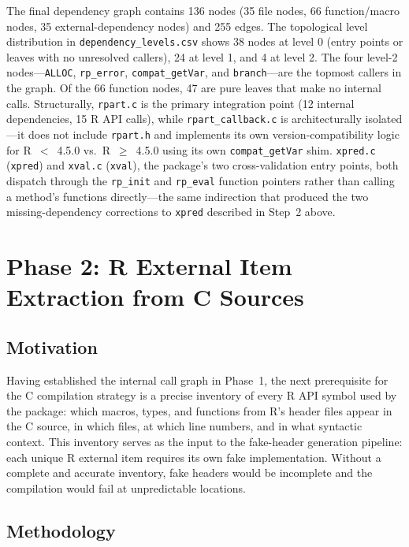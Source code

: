\documentclass[12pt]{article}
\begin{document}
The final dependency graph contains 136 nodes (35 file nodes, 66 function/macro nodes, 35 external-dependency nodes) and 255 edges. The topological level distribution in \texttt{dependency\_levels.csv} shows 38 nodes at level 0 (entry points or leaves with no unresolved callers), 24 at level 1, and 4 at level 2. The four level-2 nodes---\texttt{ALLOC}, \texttt{rp\_error}, \texttt{compat\_getVar}, and \texttt{branch}---are the topmost callers in the graph. Of the 66 function nodes, 47 are pure leaves that make no internal calls. Structurally, \texttt{rpart.c} is the primary integration point (12 internal dependencies, 15 R API calls), while \texttt{rpart\_callback.c} is architecturally isolated---it does not include \texttt{rpart.h} and implements its own version-compatibility logic for R~$<$~4.5.0 vs.\ R~$\geq$~4.5.0 using its own \texttt{compat\_getVar} shim. \texttt{xpred.c} (\texttt{xpred}) and \texttt{xval.c} (\texttt{xval}), the package's two cross-validation entry points, both dispatch through the \texttt{rp\_init} and \texttt{rp\_eval} function pointers rather than calling a method's functions directly---the same indirection that produced the two missing-dependency corrections to \texttt{xpred} described in Step~2 above.

\section{Phase 2: R External Item Extraction from C Sources}
\label{sec:phase2}

\subsection{Motivation}

Having established the internal call graph in Phase~1, the next prerequisite for the C compilation strategy is a precise inventory of every R API symbol used by the package: which macros, types, and functions from R's header files appear in the C source, in which files, at which line numbers, and in what syntactic context. This inventory serves as the input to the fake-header generation pipeline: each unique R external item requires its own fake implementation. Without a complete and accurate inventory, fake headers would be incomplete and the compilation would fail at unpredictable locations.

\subsection{Methodology}
\end{document}
